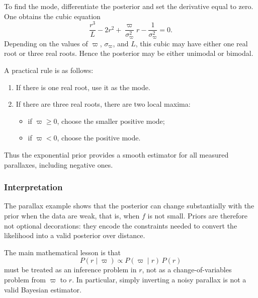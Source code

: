 \documentclass[11pt, titlepage]{article} %
\numberwithin{equation}{section}
\theoremstyle{definition}
\numberwithin{assumption}{section}
\begin{document}
To find the mode, differentiate the posterior and set the derivative equal to zero. One obtains the cubic equation
\begin{equation*}
    \frac{r^3}{L}-2r^2+\frac{\varpi}{\sigma_\varpi^2}r-\frac{1}{\sigma_\varpi^2}=0.
\end{equation*}
Depending on the values of $\varpi$, $\sigma_\varpi$, and $L$, this cubic may have either one real root or three real roots. Hence the posterior may be either unimodal or bimodal.

A practical rule is as follows:
\begin{enumerate}
    \item If there is one real root, use it as the mode.
    \item If there are three real roots, there are two local maxima:
    \begin{itemize}
        \item if $\varpi\ge 0$, choose the smaller positive mode;
        \item if $\varpi<0$, choose the positive mode.
    \end{itemize}
\end{enumerate}
Thus the exponential prior provides a smooth estimator for all measured parallaxes, including negative ones.

\subsubsection*{Interpretation}

The parallax example shows that the posterior can change substantially with the prior when the data are weak, that is, when $f$ is not small. Priors are therefore not optional decorations: they encode the constraints needed to convert the likelihood into a valid posterior over distance.

The main mathematical lesson is that
\begin{equation*}
    P(r\mid \varpi)\propto P(\varpi\mid r)\,P(r)
\end{equation*}
must be treated as an inference problem in $r$, not as a change-of-variables problem from $\varpi$ to $r$. In particular, simply inverting a noisy parallax is not a valid Bayesian estimator.
\end{document}
